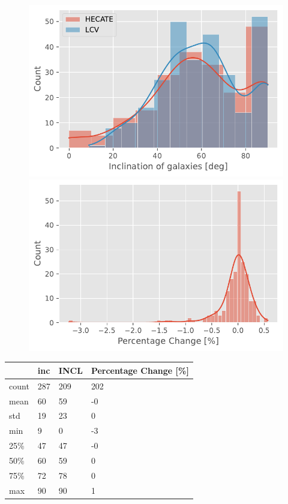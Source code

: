 \documentclass[
]{article}
\begin{document}
\begin{figure}

\begin{minipage}{0.50\linewidth}
\includegraphics{compare_files/figure-pdf/cell-24-output-1.pdf}\end{minipage}%
%
\begin{minipage}{0.50\linewidth}
\includegraphics{compare_files/figure-pdf/cell-24-output-2.pdf}\end{minipage}%

\end{figure}%

\begin{longtable}[]{@{}llll@{}}
\toprule\noalign{}
& inc & INCL & Percentage Change {[}\%{]} \\
\midrule\noalign{}
\endhead
\bottomrule\noalign{}
\endlastfoot
count & 287 & 209 & 202 \\
mean & 60 & 59 & -0 \\
std & 19 & 23 & 0 \\
min & 9 & 0 & -3 \\
25\% & 47 & 47 & -0 \\
50\% & 60 & 59 & 0 \\
75\% & 72 & 78 & 0 \\
max & 90 & 90 & 1 \\
\end{longtable}
\end{document}
